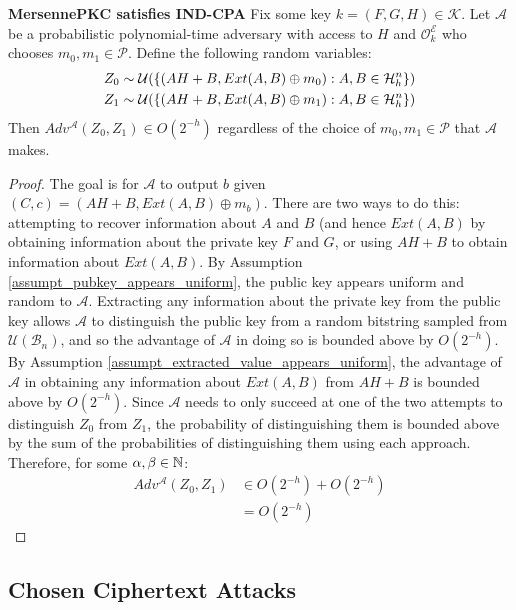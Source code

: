 \begin{theorem}{\textbf{MersennePKC satisfies IND-CPA}}
Fix some key $k = (F, G, H) \in \mathcal{K}$. Let $\mathcal{A}$ be a probabilistic polynomial-time adversary with access to $H$ and $\mathcal{O}_k^\mathcal{E}$ who chooses $m_0, m_1 \in \mathcal{P}$. Define the following random variables:
\begin{align*}
Z_0 &\sim \mathcal{U}(\{ (AH + B, Ext(A, B) \oplus m_0) : A, B \in \mathcal{H}_h^n \})\\
Z_1 &\sim \mathcal{U}(\{ (AH + B, Ext(A, B) \oplus m_1) : A, B \in \mathcal{H}_h^n \})\\
\end{align*}
Then $Adv^\mathcal{A}(Z_0, Z_1) \in O(2^{-h})$ regardless of the choice of $m_0, m_1 \in \mathcal{P}$ that $\mathcal{A}$ makes.
\end{theorem}
\begin{proof}
The goal is for $\mathcal{A}$ to output $b$ given $(C, c) = (AH + B, Ext(A, B) \oplus m_b)$. There are two ways to do this: attempting to recover information about $A$ and $B$ (and hence $Ext(A, B)$ by obtaining information about the private key $F$ and $G$, or using $AH + B$ to obtain information about $Ext(A, B)$.
\newline
By Assumption \ref{assumpt_pubkey_appears_uniform}, the public key appears uniform and random to $\mathcal{A}$. Extracting any information about the private key from the public key allows $\mathcal{A}$ to distinguish the public key from a random bitstring sampled from $\mathcal{U}(\mathcal{B}_n)$, and so the advantage of $\mathcal{A}$ in doing so is bounded above by $O(2^{-h})$.
\newline
By Assumption \ref{assumpt_extracted_value_appears_uniform}, the advantage of $\mathcal{A}$ in obtaining any information about $Ext(A, B)$ from $AH + B$ is bounded above by $O(2^{-h})$.
\newline
Since $\mathcal{A}$ needs to only succeed at one of the two attempts to distinguish $Z_0$ from $Z_1$, the probability of distinguishing them is bounded above by the sum of the probabilities of distinguishing them using each approach. Therefore, for some $\alpha, \beta \in \mathbb{N}$:
\begin{align*}
Adv^\mathcal{A}(Z_0, Z_1) &\in O(2^{-h}) + O(2^{-h})\\
&= O(2^{-h})
\end{align*}
\end{proof}

\subsection{Chosen Ciphertext Attacks}
